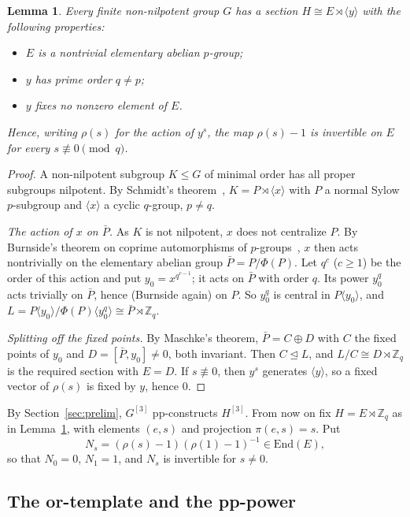 \documentclass[11pt]{article}
\newtheorem{lemma}[theorem]{Lemma}
\theoremstyle{definition}
\theoremstyle{remark}
\newcommand{\Z}{\mathbb Z}
\begin{document}
\begin{lemma}\label{lem:schmidt}
Every finite non-nilpotent group $G$ has a section $H\cong E\rtimes\langle y\rangle$
with the following properties:
\begin{itemize}
\item $E$ is a nontrivial elementary abelian $p$-group;
\item $y$ has prime order $q\ne p$;
\item $y$ fixes no nonzero element of $E$.
\end{itemize}
Hence, writing $\rho(s)$ for the action of $y^s$, the map $\rho(s)-1$ is invertible
on $E$ for every $s\not\equiv0\pmod q$.
\end{lemma}
\begin{proof}
A non-nilpotent subgroup $K\le G$ of minimal order has all proper subgroups
nilpotent. By Schmidt's theorem~\cite{Hup67,Rob96}, $K=P\rtimes\langle x\rangle$
with $P$ a normal Sylow $p$-subgroup and $\langle x\rangle$ a cyclic $q$-group,
$p\neq q$.

\emph{The action of $x$ on $\bar P$.} As $K$ is not nilpotent, $x$ does not
centralize $P$. By Burnside's theorem on coprime automorphisms of
$p$-groups~\cite{Rob96}, $x$ then acts nontrivially on the elementary abelian group
$\bar P=P/\Phi(P)$. Let $q^c$ ($c\ge1$) be the order of this action and put
$y_0=x^{q^{c-1}}$; it acts on $\bar P$ with order $q$. Its power $y_0^q$ acts
trivially on $\bar P$, hence (Burnside again) on $P$. So $y_0^q$ is central in
$P\langle y_0\rangle$, and
$L=P\langle y_0\rangle/\Phi(P)\langle y_0^q\rangle\cong\bar P\rtimes\Z_q$.

\emph{Splitting off the fixed points.} By Maschke's theorem,
$\bar P=C\oplus D$ with $C$ the fixed points of $y_0$ and $D=[\bar P,y_0]\ne0$,
both invariant. Then $C\unlhd L$, and $L/C\cong D\rtimes\Z_q$ is the required
section with $E=D$. If $s\not\equiv0$, then $y^s$ generates $\langle y\rangle$, so
a fixed vector of $\rho(s)$ is fixed by $y$, hence $0$.
\end{proof}

By Section~\ref{sec:prelim}, $G^{[3]}$ pp-constructs $H^{[3]}$. From now on fix
$H=E\rtimes\Z_q$ as in Lemma~\ref{lem:schmidt}, with elements $(e,s)$ and
projection $\pi(e,s)=s$. Put
\[
N_s=(\rho(s)-1)(\rho(1)-1)^{-1}\in\mathrm{End}(E),
\]
so that $N_0=0$, $N_1=1$, and $N_s$ is invertible for $s\ne0$.

\subsection{The or-template and the pp-power}
\end{document}
